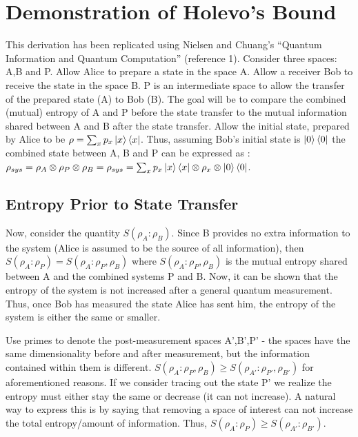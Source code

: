 \documentclass[letterpaper,twoside,10pt]{article}
\begin{document}


\section{Demonstration of Holevo's Bound}

This derivation has been replicated using Nielsen and Chuang's ``Quantum Information and Quantum Computation'' (reference 1). Consider three spaces: A,B and P. Allow Alice to prepare a state in the space A. Allow a receiver Bob to receive the state in the space B. P is an intermediate space to allow the transfer of the prepared state (A) to Bob (B). The goal will be to compare the combined (mutual) entropy of A and P before the state transfer to the mutual information shared between A and B after the state transfer. Allow the initial state, prepared by Alice to be $\rho=\sum_xp_x\ket{x}\bra{x}$. Thus, assuming Bob's initial state is $\ket{0}\bra{0}$ the combined state between A, B and P can be expressed as : $\rho_{sys}= \rho_A\otimes\rho_P\otimes\rho_B=\rho_{sys}=\sum_x p_x\ket{x}\bra{x}\otimes\rho_x \otimes \ket{0}\bra{0}$.

\subsection{Entropy Prior to State Transfer}
Now, consider the quantity $S(\rho_A:\rho_B)$. Since B provides no extra information to the system (Alice is assumed to be the source of all information), then $S(\rho_A:\rho_P)=S(\rho_A:\rho_P,\rho_B)$ where $S(\rho_A:\rho_P,\rho_B)$ is the mutual entropy shared between A and the combined systems P and B. Now, it can be shown that the entropy of the system is not increased after a general quantum measurement. Thus, once Bob has measured the state Alice has sent him, the entropy of the system is either the same or smaller. 

Use primes to denote the post-measurement spaces A',B',P' - the spaces have the same dimensionality before and after measurement, but the information contained within them is different. $S(\rho_A:\rho_P,\rho_B)\ge S(\rho_{A'}:\rho_{P'},\rho_{B'})$ for aforementioned reasons. If we consider tracing out the state P' we realize the entropy must either stay the same or decrease (it can not increase). A natural way to express this is by saying that removing a space of interest can not increase the total entropy/amount of information. Thus, $S(\rho_A:\rho_P)\ge S(\rho_{A'}:\rho_{B'})$.
\end{document}
